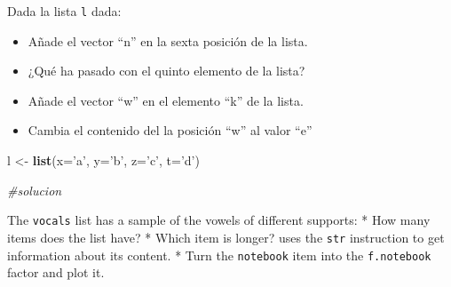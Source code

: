 \documentclass[
]{article}
\newenvironment{Shaded}{\begin{snugshade}}{\end{snugshade}}
\newcommand{\CommentTok}[1]{\textcolor[rgb]{0.56,0.35,0.01}{\textit{#1}}}
\newcommand{\DataTypeTok}[1]{\textcolor[rgb]{0.13,0.29,0.53}{#1}}
\newcommand{\DecValTok}[1]{\textcolor[rgb]{0.00,0.00,0.81}{#1}}
\newcommand{\KeywordTok}[1]{\textcolor[rgb]{0.13,0.29,0.53}{\textbf{#1}}}
\newcommand{\NormalTok}[1]{#1}
\newcommand{\OperatorTok}[1]{\textcolor[rgb]{0.81,0.36,0.00}{\textbf{#1}}}
\newcommand{\OtherTok}[1]{\textcolor[rgb]{0.56,0.35,0.01}{#1}}
\newcommand{\StringTok}[1]{\textcolor[rgb]{0.31,0.60,0.02}{#1}}
\providecommand{\tightlist}{%
  \setlength{\itemsep}{0pt}\setlength{\parskip}{0pt}}
\begin{document}
\begin{Shaded}
\end{Shaded}

Dada la lista \texttt{l} dada:

\begin{itemize}
\tightlist
\item
  Añade el vector ``n'' en la sexta posición de la lista.
\item
  ¿Qué ha pasado con el quinto elemento de la lista?
\item
  Añade el vector ``w'' en el elemento ``k'' de la lista.
\item
  Cambia el contenido del la posición ``w'' al valor ``e''
\end{itemize}

\begin{Shaded}
\begin{Highlighting}[]
\NormalTok{l <-}\StringTok{ }\KeywordTok{list}\NormalTok{(}\DataTypeTok{x=}\StringTok{'a'}\NormalTok{, }\DataTypeTok{y=}\StringTok{'b'}\NormalTok{, }\DataTypeTok{z=}\StringTok{'c'}\NormalTok{, }\DataTypeTok{t=}\StringTok{'d'}\NormalTok{)}

\CommentTok{#solucion }
\end{Highlighting}
\end{Shaded}

The \texttt{vocals} list has a sample of the vowels of different
supports: * How many items does the list have? * Which item is longer?
uses the \texttt{str} instruction to get information about its content.
* Turn the \texttt{notebook} item into the \texttt{f.notebook} factor
and plot it.
\end{document}

